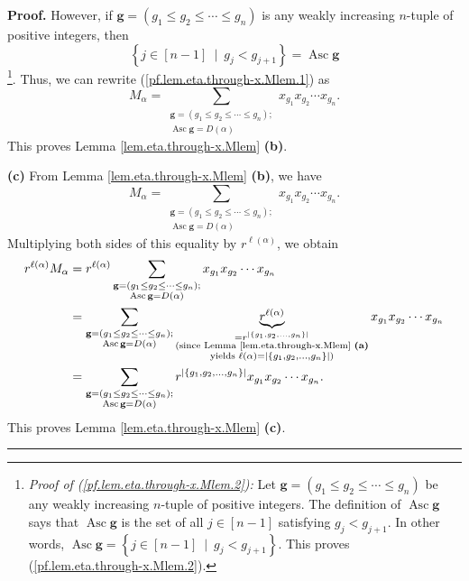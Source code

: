 \documentclass[numbers=enddot,12pt,final,onecolumn,notitlepage]{scrartcl}%
\theoremstyle{definition}
\newenvironment{proof}[1][Proof]{\noindent\textbf{#1.} }{\ \rule{0.5em}{0.5em}}
\let\sumnonlimits\sum
\renewcommand{\sum}{\sumnonlimits\limits}
\newenvironment{verlong}{}{}
\begin{document}
\begin{verlong}
\begin{proof}
However, if $\mathbf{g}=\left(  g_{1}\leq g_{2}\leq\cdots\leq g_{n}\right)  $
is any weakly increasing $n$-tuple of positive integers, then%
\begin{equation}
\left\{  j\in\left[  n-1\right]  \ \mid\ g_{j}<g_{j+1}\right\}
=\operatorname*{Asc}\mathbf{g} \label{pf.lem.eta.through-x.Mlem.2}%
\end{equation}
\footnote{\textit{Proof of (\ref{pf.lem.eta.through-x.Mlem.2}):} Let
$\mathbf{g}=\left(  g_{1}\leq g_{2}\leq\cdots\leq g_{n}\right)  $ be any
weakly increasing $n$-tuple of positive integers. The definition of
$\operatorname*{Asc}\mathbf{g}$ says that $\operatorname*{Asc}\mathbf{g}$ is
the set of all $j\in\left[  n-1\right]  $ satisfying $g_{j}<g_{j+1}$. In other
words, $\operatorname*{Asc}\mathbf{g}=\left\{  j\in\left[  n-1\right]
\ \mid\ g_{j}<g_{j+1}\right\}  $. This proves
(\ref{pf.lem.eta.through-x.Mlem.2}).}. Thus, we can rewrite
(\ref{pf.lem.eta.through-x.Mlem.1}) as
\[
M_{\alpha}=\sum_{\substack{\mathbf{g}=\left(  g_{1}\leq g_{2}\leq\cdots\leq
g_{n}\right)  ;\\\operatorname*{Asc}\mathbf{g}=D\left(  \alpha\right)
}}x_{g_{1}}x_{g_{2}}\cdots x_{g_{n}}.
\]
This proves Lemma \ref{lem.eta.through-x.Mlem} \textbf{(b)}. \medskip

\textbf{(c)} From Lemma \ref{lem.eta.through-x.Mlem} \textbf{(b)}, we have%
\[
M_{\alpha}=\sum_{\substack{\mathbf{g}=\left(  g_{1}\leq g_{2}\leq\cdots\leq
g_{n}\right)  ;\\\operatorname*{Asc}\mathbf{g}=D\left(  \alpha\right)
}}x_{g_{1}}x_{g_{2}}\cdots x_{g_{n}}.
\]
Multiplying both sides of this equality by $r^{\ell\left(  \alpha\right)  }$,
we obtain%
\begin{align*}
r^{\ell\left(  \alpha\right)  }M_{\alpha}  &  =r^{\ell\left(  \alpha\right)
}\sum_{\substack{\mathbf{g}=\left(  g_{1}\leq g_{2}\leq\cdots\leq
g_{n}\right)  ;\\\operatorname*{Asc}\mathbf{g}=D\left(  \alpha\right)
}}x_{g_{1}}x_{g_{2}}\cdots x_{g_{n}}\\
&  =\sum_{\substack{\mathbf{g}=\left(  g_{1}\leq g_{2}\leq\cdots\leq
g_{n}\right)  ;\\\operatorname*{Asc}\mathbf{g}=D\left(  \alpha\right)
}}\underbrace{r^{\ell\left(  \alpha\right)  }}_{\substack{=r^{\left\vert
\left\{  g_{1},g_{2},\ldots,g_{n}\right\}  \right\vert }\\\text{(since Lemma
\ref{lem.eta.through-x.Mlem} \textbf{(a)}}\\\text{yields }\ell\left(
\alpha\right)  =\left\vert \left\{  g_{1},g_{2},\ldots,g_{n}\right\}
\right\vert \text{)}}}x_{g_{1}}x_{g_{2}}\cdots x_{g_{n}}\\
&  =\sum_{\substack{\mathbf{g}=\left(  g_{1}\leq g_{2}\leq\cdots\leq
g_{n}\right)  ;\\\operatorname*{Asc}\mathbf{g}=D\left(  \alpha\right)
}}r^{\left\vert \left\{  g_{1},g_{2},\ldots,g_{n}\right\}  \right\vert
}x_{g_{1}}x_{g_{2}}\cdots x_{g_{n}}.
\end{align*}
This proves Lemma \ref{lem.eta.through-x.Mlem} \textbf{(c)}.
\end{proof}


\end{verlong}
\end{document}
